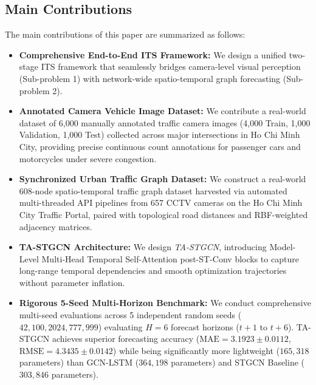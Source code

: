 \subsection{Main Contributions}
The main contributions of this paper are summarized as follows:
\begin{itemize}
    \item \textbf{Comprehensive End-to-End ITS Framework:} We design a unified two-stage ITS framework that seamlessly bridges camera-level visual perception (Sub-problem 1) with network-wide spatio-temporal graph forecasting (Sub-problem 2).
    \item \textbf{Annotated Camera Vehicle Image Dataset:} We contribute a real-world dataset of 6,000 manually annotated traffic camera images (4,000 Train, 1,000 Validation, 1,000 Test) collected across major intersections in Ho Chi Minh City, providing precise continuous count annotations for passenger cars and motorcycles under severe congestion.
    \item \textbf{Synchronized Urban Traffic Graph Dataset:} We construct a real-world 608-node spatio-temporal traffic graph dataset harvested via automated multi-threaded API pipelines from 657 CCTV cameras on the Ho Chi Minh City Traffic Portal, paired with topological road distances and RBF-weighted adjacency matrices.
    \item \textbf{TA-STGCN Architecture:} We design \emph{TA-STGCN}, introducing Model-Level Multi-Head Temporal Self-Attention \cite{attention} post-ST-Conv blocks to capture long-range temporal dependencies and smooth optimization trajectories without parameter inflation.
    \item \textbf{Rigorous 5-Seed Multi-Horizon Benchmark:} We conduct comprehensive multi-seed evaluations across 5 independent random seeds ($42, 100, 2024, 777, 999$) evaluating $H=6$ forecast horizons ($t+1$ to $t+6$). TA-STGCN achieves superior forecasting accuracy ($\text{MAE} = 3.1923 \pm 0.0112$, $\text{RMSE} = 4.3435 \pm 0.0142$) while being significantly more lightweight ($165,318$ parameters) than GCN-LSTM \cite{gcn} ($364,198$ parameters) and STGCN Baseline \cite{stgcn} ($303,846$ parameters).
\end{itemize}
